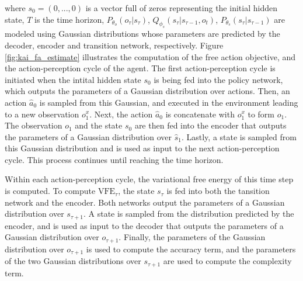 \documentclass[twoside,11pt]{article}
\begin{document}
where $s_0 = (0, ..., 0)$ is a vector full of zeros representing the initial hidden state, $T$ is the time horizon, $P_{\theta_o}(o_\tau|s_\tau)$, $Q_{\phi_s}(s_\tau|s_{\tau-1}, o_t)$, $P_{\theta_s}(s_\tau|s_{\tau-1})$ are modeled using Gaussian distributions whose parameters are predicted by the decoder, encoder and transition network, respectively. Figure \ref{fig:kai_fa_estimate} illustrates the computation of the free action objective, and the action-perception cycle of the agent. The first action-perception cycle is initiated when the intital hidden state $s_0$ is being fed into the policy network, which outputs the parameters of a Gaussian distribution over actions. Then, an action $\hat{a}_0$ is sampled from this Gaussian, and executed in the environment leading to a new observation $o_1^x$. Next, the action $\hat{a}_0$ is concatenate with $o_1^x$ to form $o_1$. The observation $o_1$ and the state $s_0$ are then fed into the encoder that outputs the parameters of a Gaussian distribution over $\hat{s}_1$. Lastly, a state is sampled from this Gaussian distribution and is used as input to the next action-perception cycle. This process continues until reaching the time horizon.

Within each action-perception cycle, the variational free energy of this time step is computed. To compute $\text{VFE}_\tau$, the state $s_\tau$  is fed into both the tansition network and the encoder. Both networks output the parameters of a Gaussian distribution over $s_{\tau+1}$. A state is sampled from the distribution predicted by the encoder, and is used as input to the decoder that outputs the parameters of a Gaussian distribution over $o_{\tau + 1}$. Finally, the parameters of the Gaussian distribution over $o_{\tau + 1}$ is used to compute the accuracy term, and the parameters of the two Gaussian distributions over $s_{\tau+1}$ are used to compute the complexity term.
\end{document}
